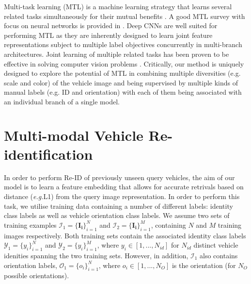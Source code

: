 \documentclass[10pt,twocolumn,letterpaper]{article}
\def\eg{\emph{e.g.\hspace{0.3em}}}
\begin{document}
Multi-task learning (MTL) is a machine learning strategy
that learns several related tasks simultaneously for
their mutual benefits \cite{argyriou2007multi}. %
A good MTL survey with focus on neural networks
is provided in \cite{caruana1997multitask}.
%
Deep CNNs are well suited for
performing MTL as they are inherently designed to learn joint
feature representations subject to multiple label objectives
concurrently in multi-branch architectures.
%
Joint learning of multiple related tasks
has been proven to be effective in solving computer vision problems
\cite{dong2017multi,zhang2016learning}.
%
Critically, our method is uniquely designed to
explore the potential of MTL
in combining multiple diversities (e.g. scale and color) of the vehicle image
and being supervised by multiple kinds of manual labels (e.g. ID and orientation) with each of them being associated with an individual branch of a single model.


\section{Multi-modal Vehicle Re-identification}

In order to perform Re-ID of previously unseen query vehicles, the aim of our model is to learn a feature embedding that allows for accurate retrivals based on distance (\eg L1) from the query image representation. In order to perform this task, we utilise training data containing a number of different labels: identity class labels as well as vehicle orientation class labels.
We assume two sets of training examples $\mathcal{I}_1 = \{\mathbf{I_i}\}_{i=1}^N$ and $\mathcal{I}_2 = \{\mathbf{I_i}\}_{i=1}^M$, containing $N$ and $M$ training images respectively. Both training sets contain the associated identity class labels $\mathcal{Y}_1=\{y_i\}_{i=1}^N$ and $\mathcal{Y}_2=\{y_i\}_{i=1}^M$, where $y_i \in \left[1,...,N_{id}\right]$ for $N_{id}$ distinct vehicle idenities spanning the two training sets. However, in addition, $\mathcal{I}_1$ also contains orientation labels, $\mathcal{O_1}=\{o_i\}_{i=1}^N$, where $o_i \in \left[1,...,N_O\right]$ is the orientation (for $N_O$ possible orientations).
\end{document}
